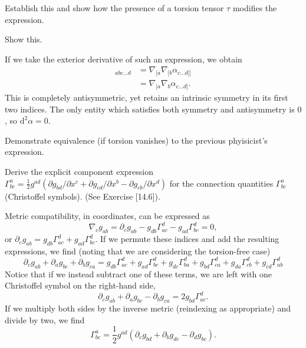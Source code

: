 \documentclass[../the-road-to-reality.tex]{subfiles}
\begin{document}
\begin{questions}
\question Establish this and show how the presence of a torsion tensor $\tau$
  modifies the expression.

\question Show this.

  \begin{solution}
    If we take the exterior derivative of such an expression, we obtain
    \begin{align*}
      [\mathrm{d}(\mathrm{d}\alpha)]_{abc\dots{d}} &= \nabla_{[a}\nabla_{[b}\alpha_{c\dots{d}]]} \\
      &= \nabla_{[a}\nabla_{b}\alpha_{c\dots{d}]}.
    \end{align*}
    This is completely antisymmetric, yet retains an intrinsic symmetry in its
    first two indices. The only entity which satisfies both symmetry and
    antisymmetry is $0$, so $\mathrm{d}^2\alpha = 0$.
  \end{solution}

\question Demonstrate equivalence (if torsion vanishes) to the previous
  phyisicist's expression.

\question Derive the explicit component expression
  $\Gamma^a_{bc}=\frac{1}{2}g^{ad}(\partial{g_{bd}}/\partial{x^c} +
  \partial{g_{cd}}/\partial{x^b} - \partial{g_{cb}}/\partial{x^d})$ for the
    connection quantities $\Gamma^a_{bc}$ (Christoffel symbols). (See Exercise
    [14.6]).

    \begin{solution}
      Metric compatibility, in coordinates, can be expressed as
      \[
        \nabla_cg_{ab} = \partial_cg_{ab} - g_{db}\Gamma^d_{ac} -
        g_{ad}\Gamma^d_{bc} = 0,
      \]
      or $\partial_cg_{ab} = g_{db}\Gamma^d_{ac} + g_{ad}\Gamma^d_{bc}$. If we
      permute these indices and add the resulting expressions, we find (noting
      that we are considering the torsion-free case)
      \[
        \partial_cg_{ab} + \partial_ag_{bc} + \partial_bg_{ca} =
        g_{db}\Gamma^d_{ac} + g_{ad}\Gamma^d_{bc} + g_{dc}\Gamma^d_{ba} +
        g_{bd}\Gamma^d_{ca} + g_{da}\Gamma^d_{cb} + g_{cd}\Gamma^d_{ab}
      \]
      Notice that if we instead subtract one of these terms, we are left with
      one Christoffel symbol on the right-hand side,
      \[
        \partial_cg_{ab} + \partial_ag_{bc} - \partial_bg_{ca} = 2g_{bd}\Gamma^d_{ac}.
      \]
      If we multiply both sides by the inverse metric (reindexing as
      appropriate) and divide by two, we find
      \[
        \Gamma^a_{bc} = \frac{1}{2}g^{ad}(\partial_cg_{bd} + \partial_bg_{dc} - \partial_dg_{bc}).
      \]
    \end{solution}


\end{questions}
\end{document}
